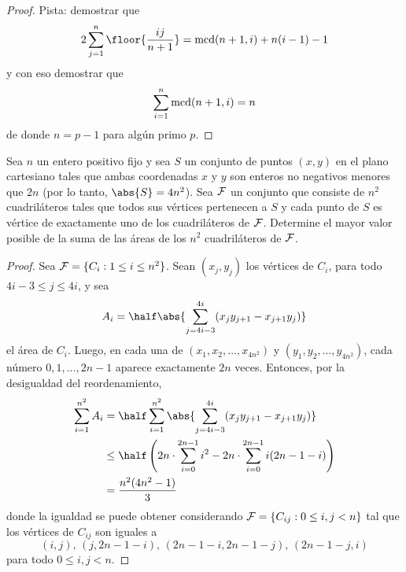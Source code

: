 \begin{proof}
	Pista: demostrar que
	\[2\sum_{j=1}^n\floor{\frac{ij}{n+1}}=\mcd(n+1,i)+n(i-1)-1\]
	y con eso demostrar que
	\[\sum_{i=1}^n\operatorname{mcd}(n+1,i)=n\]
	de donde $n=p-1$ para algún primo $p$.
\end{proof}

\begin{probMB}
	Sea $n$ un entero positivo fijo y sea $S$ un conjunto de puntos $(x,y)$ en el plano cartesiano tales que ambas coordenadas $x$ y $y$ son enteros no negativos menores que $2n$ (por lo tanto, $\abs{S}=4n^2$). Sea $\cal F$ un conjunto que consiste de $n^2$ cuadriláteros tales que todos sus vértices pertenecen a $S$ y cada punto de $S$ es vértice de exactamente uno de los cuadriláteros de $\cal F$. Determine el mayor valor posible de la suma de las áreas de los $n^2$ cuadriláteros de $\cal F$.
\end{probMB}

\begin{proof}
	Sea ${\cal F}=\{C_i:1\le i\le n^2\}$. Sean $(x_j,y_j)$ los vértices de $C_i$, para todo $4i-3\le j\le 4i$, y sea
	\[A_i=\half\abs{\sum_{j=4i-3}^{4i}(x_jy_{j+1}-x_{j+1}y_j)}\]
	el área de $C_i$. Luego, en cada una de $(x_1,x_2,\dots,x_{4n^2})$ y $(y_1,y_2,\dots,y_{4n^2})$, cada número $0,1,\dots,2n-1$ aparece exactamente $2n$ veces. Entonces, por la desigualdad del reordenamiento, 
	\begin{align*}
		\sum_{i=1}^{n^2}A_i
		&=\half\sum_{i=1}^{n^2}\abs{\sum_{j=4i-3}^{4i}(x_jy_{j+1}-x_{j+1}y_j)}\\
		&\le\half\left(2n\cdot\sum_{i=0}^{2n-1}i^2-2n\cdot\sum_{i=0}^{2n-1}i(2n-1-i)\right)\\
		&=\frac{n^2(4n^2-1)}{3}
	\end{align*}
	donde la igualdad se puede obtener considerando ${\cal F}=\{C_{ij}:0\le i,j<n\}$ tal que los vértices de $C_{ij}$ son iguales a
	\[(i,j),\,(j,2n-1-i),\,(2n-1-i,2n-1-j),\,(2n-1-j,i)\]
	para todo $0\le i,j<n$.
\end{proof}

